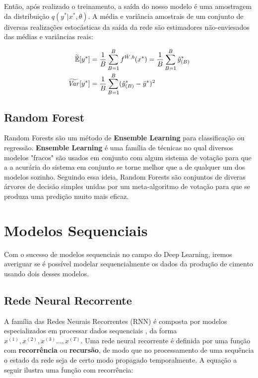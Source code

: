 Então, após realizado o treinamento, a saída do nosso modelo é uma amostragem da distribuição $q(y^* | x^* , \theta)$.
A média e variância amostrais de um conjunto de diversas realizações estocásticas da saída da rede são estimadores não-enviesados das médias e variâncias reais:

\begin{align*}
  \label{eq:aproxs}
  \widetilde{\mathbb{E}}[y^*] &=
   \frac{1}{B}\sum^B_{B=1}\mathnormal{f}^{\hat{W},b}(x^*) = \frac{1}{B}\sum^B_{B=1}\hat{y}^*_{(B)}\\ 
   \widetilde{\mathit{Var}}[y^*]  &= \frac{1}{B}\sum^B_{B=1}(\hat{y}^*_{(B)} - \bar{y}^*)^2 
 \end{align*}
 
\subsection{Random Forest}

Random Forests são um método de \textbf{Ensemble Learning} para classificação ou regressão. \textbf{Ensemble Learning} é uma família de técnicas no qual diversos modelos "fracos" são usados em conjunto com algum sistema de votação para que a a acurária do sistema em conjunto se torne melhor que a de qualquer um dos modelos sozinho. Seguindo essa ideia, Random Forests são conjuntos de diveras árvores de decisão simples unidas por um meta-algoritmo de votação para que se produza uma predição muito mais eficaz.


\section{Modelos Sequenciais}
Com o sucesso de modelos sequenciais no campo do Deep Learning, iremos averiguar se é possível modelar sequencialmente os dados da produção de cimento usando dois desses modelos. 
\\

\subsection{Rede Neural Recorrente}
% 

A família das Redes Neurais Recorrentes (RNN) é composta por modelos especializados
em processar dados sequenciais \citep{dlbook}, da forma $x^{(1)},x^{(2)} ,x^{(3)}\dots ,x^{(T)}$. Uma rede neural recorrente é definida por uma função com
\textbf{recorrência} ou \textbf{recursão}, de modo que no processamento de uma
sequência o estado da rede seja de certo modo propagado temporalmente. A equação
a seguir ilustra uma função com recorrência: \\


